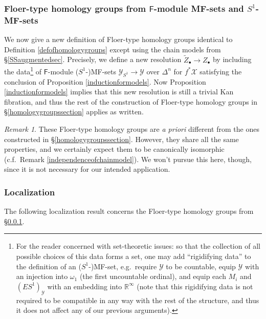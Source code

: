 \documentclass[12pt]{article}
\theoremstyle{definition}
\theoremstyle{remark}
\newtheorem{remark}[theorem]{Remark}
\numberwithin{equation}{subsection}
\newcommand{\X}{\mathcal X}
\newcommand{\Y}{\mathcal Y}
\newcommand{\RR}{\mathbb R}
\newcommand{\sF}{\mathsf{F}}
\begin{document}
\subsubsection{Floer-type homology groups from $\sF$-module MF-sets and $S^1$-MF-sets}\label{floerhomologyfromMFsets}

We now give a new definition of Floer-type homology groups identical to Definition \ref{defofhomologygroups} except using the chain models from \S\ref{SSaugmentedsec}.  Precisely, we define a new resolution $\tilde Z_\bullet\to Z_\bullet$ by including the data\footnote{For the reader concerned with set-theoretic issues: so that the collection of all possible choices of this data forms a set, one may add ``rigidifying data'' to the definition of an ($S^1$-)MF-set, e.g.\ require $\Y$ to be countable, equip $\Y$ with an injection into $\omega_1$ (the first uncountable ordinal), and equip each $M_i$ and $(ES^1)_\Y$ with an embedding into $\RR^\infty$ (note that this rigidifying data is not required to be compatible in any way with the rest of the structure, and thus it does not affect any of our previous arguments).} of $\sF$-module ($S^1$-)MF-sets $\Y_{S^1}\to\Y$ over $\Delta^n$ for $f^\ast\X$ satisfying the conclusion of Proposition \ref{inductionformodels}.  Now Proposition \ref{inductionformodels} implies that this new resolution is still a trivial Kan fibration, and thus the rest of the construction of Floer-type homology groups in \S\ref{homologygroupssection} applies as written.

\begin{remark}
These Floer-type homology groups are \emph{a priori} different from the ones constructed in \S\ref{homologygroupssection}.  However, they share all the same properties, and we certainly expect them to be canonically isomorphic (c.f.\ Remark \ref{independenceofchainmodel}).  We won't pursue this here, though, since it is not necessary for our intended application.
\end{remark}

\subsubsection{Localization}

The following localization result concerns the Floer-type homology groups from \S\ref{floerhomologyfromMFsets}.
\end{document}
